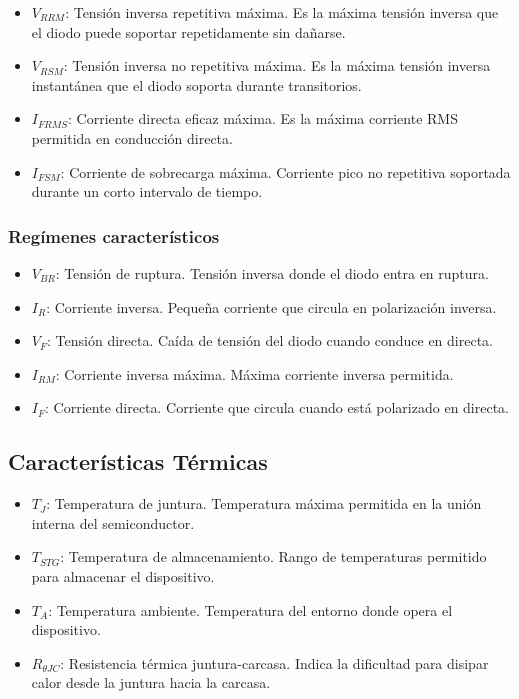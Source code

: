 \begin{itemize}

    \item $V_{RRM}$: Tensión inversa repetitiva máxima.  
    Es la máxima tensión inversa que el diodo puede soportar repetidamente sin dañarse.  
    \item $V_{RSM}$: Tensión inversa no repetitiva máxima.  
    Es la máxima tensión inversa instantánea que el diodo soporta durante transitorios.  
    \item $I_{FRMS}$: Corriente directa eficaz máxima.  
    Es la máxima corriente RMS permitida en conducción directa. 
    \item $I_{FSM}$: Corriente de sobrecarga máxima.  
    Corriente pico no repetitiva soportada durante un corto intervalo de tiempo. 

\end{itemize}


\subsubsection*{Regímenes característicos}

\begin{itemize}

    \item $V_{BR}$: Tensión de ruptura.
    Tensión inversa donde  el diodo entra en ruptura.  
    \item $I_R$: Corriente inversa.  
    Pequeña corriente que circula en polarización inversa.  
    \item $V_F$: Tensión directa.  
    Caída de tensión del diodo cuando conduce en directa. 
    \item $I_{RM}$: Corriente inversa máxima.  
    Máxima corriente inversa permitida. 
    \item $I_F$: Corriente directa.  
    Corriente que circula cuando está polarizado en directa.  

\end{itemize}


\subsection{Características Térmicas}

\begin{itemize}

    \item $T_J$: Temperatura de juntura.  
    Temperatura máxima permitida en la unión interna del semiconductor.  
    \item $T_{STG}$: Temperatura de almacenamiento.  
    Rango de temperaturas permitido para almacenar el dispositivo.  
    \item $T_A$: Temperatura ambiente.  
    Temperatura del entorno donde opera el dispositivo.  
    \item $R_{\theta JC}$: Resistencia térmica juntura-carcasa.  
    Indica la dificultad para disipar calor desde la juntura hacia la carcasa.  

\end{itemize}


